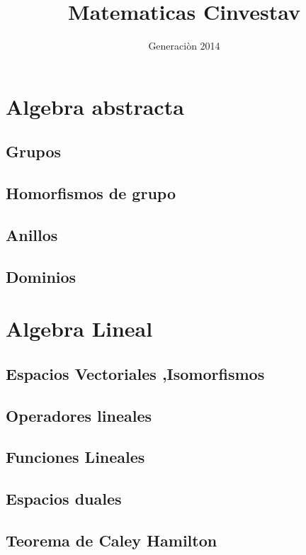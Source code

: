 \documentclass[letterpaper,12pt]{report}
\title{Matematicas Cinvestav}
\author{Generaci\`on 2014}
\begin{document}
  \maketitle
  \tableofcontents
  \part{Algebra abstracta}
    \chapter{Grupos}
      
      
      
    \chapter{Homorfismos de grupo}
      
    \chapter{Anillos}
    \chapter{Dominios}
  \part{Algebra Lineal}
    \chapter{Espacios Vectoriales ,Isomorfismos}
    \chapter{Operadores lineales}
    \chapter{Funciones Lineales}
    \chapter{Espacios duales}
    \chapter{Teorema de Caley Hamilton}
\end{document}
